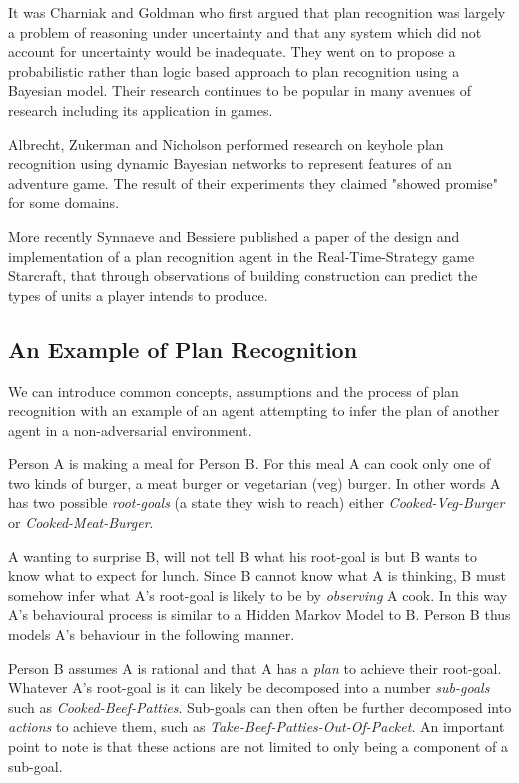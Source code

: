 \documentclass[parskip]{cs4rep}
\begin{document}
It was Charniak and Goldman \cite{journals/ai/CharniakG93} who first argued that plan recognition was largely a problem of reasoning under uncertainty and that any system which did not account for uncertainty would be inadequate. They went on to propose a probabilistic rather than logic based approach to  plan recognition using a Bayesian model. Their research continues to be popular in many avenues of research including its application in games.

Albrecht, Zukerman and Nicholson \cite{Albrecht:1998:BMK:598277.598308} performed research on keyhole plan recognition using dynamic Bayesian networks to represent features of an adventure game. The result of their experiments they claimed "showed promise" for some domains. 

More recently Synnaeve and Bessiere \cite{conf/aiide/SynnaeveB11} published a paper of the design and implementation of a plan recognition agent in the Real-Time-Strategy game Starcraft, that through observations of building construction can predict the types of units a player intends to produce.

\subsection{An Example of Plan Recognition}

We can introduce common concepts, assumptions and the process of plan recognition with an example of an agent attempting to infer the plan of another agent in a non-adversarial environment. 

Person A is making a meal for Person B. For this meal A can cook only one of two kinds of burger, a meat burger or vegetarian (veg) burger. In other words A has two possible \textit{root-goals} (a state they wish to reach) either \textit{Cooked-Veg-Burger} or \textit{Cooked-Meat-Burger}. 

A wanting to surprise B, will not tell B what his root-goal is but B wants to know what to expect for lunch. Since B cannot know what A is thinking, B must somehow infer what A's root-goal is likely to be by \textit{observing} A cook. In this way A's behavioural process is similar to a Hidden Markov Model to B. Person B thus models A's behaviour in the following manner. 

Person B assumes A is rational and that A has a \textit{plan} to achieve their root-goal. Whatever A's root-goal is it can likely be decomposed into a number \textit{sub-goals} such as \textit{Cooked-Beef-Patties}. Sub-goals can then often be further decomposed into \textit{actions} to achieve them, such as \textit{Take-Beef-Patties-Out-Of-Packet}. An important point to note is that these actions are not limited to only being a component of a sub-goal.
\end{document}
